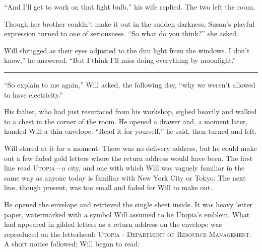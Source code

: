 \documentclass[12pt,letterpaper,oneside,english]{book}
\begin{document}
``And I'll get to work on that light bulb,'' his wife replied.
The two left the room.

Though her brother couldn't make it out in the sudden darkness, Susan's
playful expression turned to one of seriousness. ``So what do you
think?'' she asked.

Will shrugged as their eyes adjusted to the dim light from the windows.
I don't know,'' he answered. ``But I think I'll miss doing everything by
moonlight.''

\medskip
{\centering\rule{\linewidth}{1pt}}
\smallskip

``So explain to me again,'' Will asked, the following day, ``why
we weren't allowed to have electricity.''

His father, who had just resurfaced from his workshop, sighed heavily
and walked to a chest in the corner of the room. He opened a drawer
and, a moment later, handed Will a thin envelope. ``Read it for
yourself,'' he said, then turned and left.

Will stared at it for a moment. There was no delivery address, but
he could make out a few faded gold letters where the return address
would have been. The first line read \textsc{Utopia}---a city, and one
with which Will was vaguely familiar in the same way as anyone today is
familiar with New York City or Tokyo. The next line, though present, was
too small and faded for Will to make out.

He opened the envelope and retrieved the single sheet inside. It was
heavy letter paper, watermarked with a symbol Will assumed to be
Utopia's emblem. What had appeared in gilded letters as a return address
on the envelope was reproduced on the letterhead: \textsc{Utopia -
Department of Resource Management}.  A short notice followed; Will began
to read:

\medskip
{}
\medskip
\end{document}
